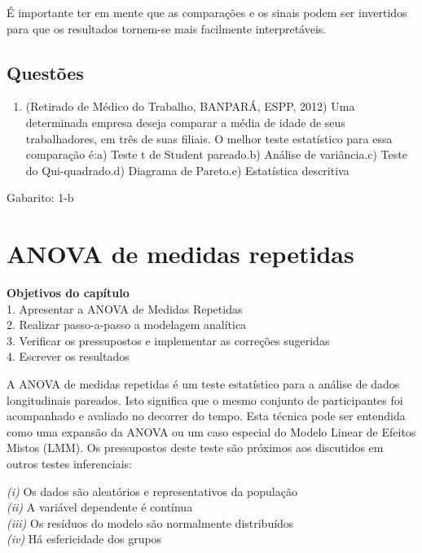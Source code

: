 \documentclass[
]{book}
\providecommand{\tightlist}{%
  \setlength{\itemsep}{0pt}\setlength{\parskip}{0pt}}
\newenvironment{objectives}{
  \definecolor{shadecolor}{rgb}{0.764,0.992,0.686}  %
  \color{black}
  \begin{shaded}}
 {\end{shaded}}
\begin{document}
É importante ter em mente que as comparações e os sinais podem ser invertidos para que os resultados tornem-se mais facilmente interpretáveis.

\hypertarget{questuxf5es-6}{%
\section{Questões}\label{questuxf5es-6}}

\begin{enumerate}
\def\labelenumi{\arabic{enumi}.}
\tightlist
\item
  (Retirado de Médico do Trabalho, BANPARÁ, ESPP, 2012) Uma determinada empresa deseja comparar a média de idade de seus trabalhadores, em três de suas filiais. O melhor teste estatístico para essa comparação é:a) Teste t de Student pareado.b) Análise de variância.c) Teste do Qui-quadrado.d) Diagrama de Pareto.e) Estatística descritiva
\end{enumerate}

Gabarito: 1-b

\hypertarget{anova-de-medidas-repetidas}{%
\chapter{ANOVA de medidas repetidas}\label{anova-de-medidas-repetidas}}

\begin{objectives}
\textbf{Objetivos do capítulo}\\
1. Apresentar a ANOVA de Medidas Repetidas\\
2. Realizar passo-a-passo a modelagem analítica\\
3. Verificar os pressupostos e implementar as correções sugeridas\\
4. Escrever os resultados

\end{objectives}

A ANOVA de medidas repetidas é um teste estatístico para a análise de dados longitudinais pareados. Isto significa que o mesmo conjunto de participantes foi acompanhado e avaliado no decorrer do tempo. Esta técnica pode ser entendida como uma expansão da ANOVA ou um caso especial do Modelo Linear de Efeitos Mistos (LMM). Os pressupostos deste teste são próximos aos discutidos em outros testes inferenciais:

\emph{(i)} Os dados são aleatórios e representativos da população\\
\emph{(ii)} A variável dependente é contínua\\
\emph{(iii)} Os resíduos do modelo são normalmente distribuídos\\
\emph{(iv)} Há esfericidade dos grupos
\end{document}
